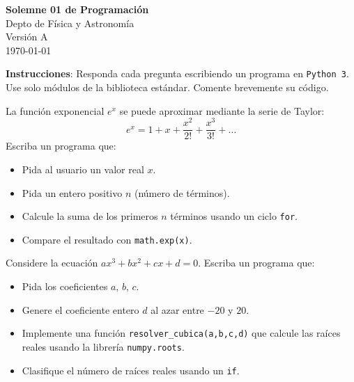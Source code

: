 \documentclass[10pt]{article}
\begin{document}
\begin{center}
  {\huge\bfseries\textcolor{unabblue}{Solemne 01 de Programación}}\\[4pt]
  {\Large\sffamily\textcolor{unabgold}{Depto de Física y Astronomía}}\\[6pt]
  {\large\sffamily Versión A}\\[10pt]
  \today
\end{center}

\vspace{1em}
\noindent\textbf{Instrucciones}: Responda cada pregunta escribiendo un programa en \texttt{Python 3}. Use solo módulos de la biblioteca estándar. Comente brevemente su código.

\noindent\makebox[\linewidth]{\rule{\textwidth}{0.4pt}}


\begin{tcolorbox}[title={Pregunta 1 – Aproximación de $e^x$}]
La función exponencial $e^x$ se puede aproximar mediante la serie de Taylor:
\[
  e^x = 1 + x + \frac{x^2}{2!} + \frac{x^3}{3!} + \dots
\]
Escriba un programa que:
\begin{itemize}
  \item Pida al usuario un valor real $x$.
  \item Pida un entero positivo $n$ (número de términos).
  \item Calcule la suma de los primeros $n$ términos usando un ciclo \texttt{for}.
  \item Compare el resultado con \texttt{math.exp(x)}.
\end{itemize}
\end{tcolorbox}


\begin{tcolorbox}[title={Pregunta 2 – Ecuación cúbica}]
Considere la ecuación $ax^{3}+bx^{2}+cx+d=0$. 
Escriba un programa que:
\begin{itemize}
  \item Pida los coeficientes $a,\,b,\,c$.
  \item Genere el coeficiente entero $d$ al azar entre $-20$ y $20$.
  \item Implemente una función \texttt{resolver\_cubica(a,b,c,d)} que calcule las raíces reales usando la librería \texttt{numpy.roots}.
  \item Clasifique el número de raíces reales usando un \texttt{if}.
\end{itemize}
\end{tcolorbox}
\end{document}
